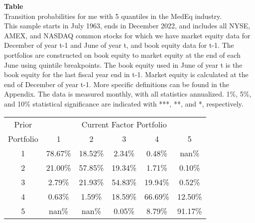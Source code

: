 \begin{table*}[ht!]
\raggedright
{}
\label{tab: transition_probs_me_MedEq_with_5_quantiles}
\textbf{Table \thetable} \\
Transition probabilities for me with 5 quantiles in the MedEq industry. \\
\hspace*{1em}This sample starts in July 1963, ends in December 2022, and includes all NYSE, AMEX, and NASDAQ common stocks for which we have market equity data for December of year t-1 and June of year t, and book equity data for t-1. The portfolios are constructed on book equity to market equity at the end of each June using quintile breakpoints.  The book equity used in June of year t is the book equity for the last fiscal year end in t-1.  Market equity is calculated at the end of December of year t-1.  More specific definitions can be found in the Appendix.  The data is measured monthly, with all statistics annualized.  1\%, 5\%, and 10\% statistical significance are indicated with ***, **, and *, respectively. \\
\vspace{0.5em}
\centering
\begin{adjustbox}{max width=\textwidth}
\begin{tabular}{@{}cccccc@{}}
\toprule
Prior & \multicolumn{5}{c}{Current Factor Portfolio} \\
Portfolio & 1 & 2 & 3 & 4 & 5 \\
\midrule
1 & 78.67\% & 18.52\% & 2.34\% & 0.48\% & nan\% \\
2 & 21.00\% & 57.85\% & 19.34\% & 1.71\% & 0.10\% \\
3 & 2.79\% & 21.93\% & 54.83\% & 19.94\% & 0.52\% \\
4 & 0.63\% & 1.59\% & 18.59\% & 66.69\% & 12.50\% \\
5 & nan\% & nan\% & 0.05\% & 8.79\% & 91.17\% \\
\bottomrule
\end{tabular}
\end{adjustbox}
\end{table*}